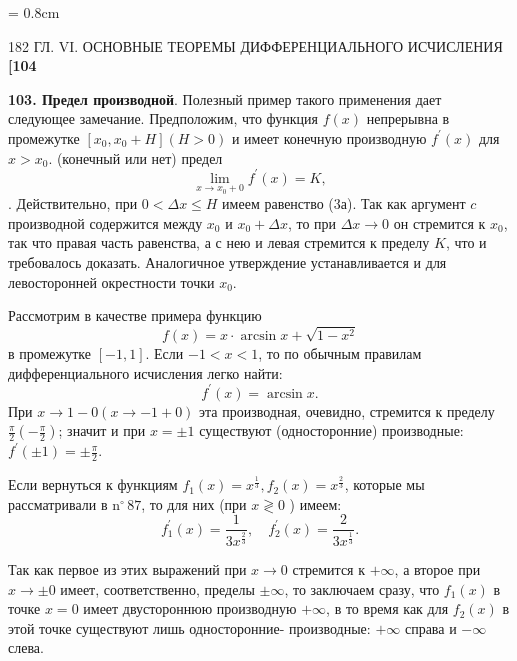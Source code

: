 \documentclass{book}
\begin{document}
\pagestyle{empty}
\parindent = 0.8cm
\fontsize{15.5pt}{14.5pt}\selectfont
{}
\abovedisplayskip=5pt
\belowdisplayskip=5pt
\newenvironment{boldequation}{\renewcommand\theequation{\textbf{\arabic{equation}}}\equation}
{\endequation}

\begin{center} 182
	\hspace{22pt}
	{\normalsize \textsection ГЛ. VI. ОСНОВНЫЕ ТЕОРЕМЫ ДИФФЕРЕНЦИАЛЬНОГО ИСЧИСЛЕНИЯ}
	\hspace{22pt}
	\textbf{[104}\\
\end{center}

\smallskip

\textbf{103. Предел производной}. Полезный пример такого применения дает следующее замечание. Предположим, что функция $f(x)$ непрерывна в промежутке $\left[x_{0}, x_{0}+H\right](H>0)$ и имеет конечную производную $f^{\prime}(x)$ для $x>x_{0}$.  (конечный или нет) предел
$$
	\lim _{x \rightarrow x_{0}+0} f^{\prime}(x)=K,
$$
. Действительно, при $0<\Delta x \leqslant H$ имеем равенство (3а). Так как аргумент $c$ производной содержится между $x_{0}$ и $x_{0}+\Delta x$, то при $\Delta x \rightarrow 0$ он стремится к $x_{0}$, так что правая часть равенства, а с нею и левая стремится к пределу $K$, что и требовалось доказать. Аналогичное утверждение устанавливается и для левосторонней окрестности точки $x_{0}$.

Рассмотрим в качестве примера функцию
$$
	f(x)=x \cdot \arcsin x+\sqrt{1-x^{2}}
$$
в промежутке $[-1,1]$. Если $-1<x<1$, то по обычным правилам дифференциального исчисления легко найти:
$$
	f^{\prime}(x)=\arcsin x.
$$
\noindent При $x \rightarrow 1-0(x \rightarrow-1+0)$ эта производная, очевидно, стремится к пределу $\frac{\pi}{2}\left(-\frac{\pi}{2}\right)$; значит и при $x= \pm 1$ существуют (односторонние) производные: $f^{\prime}( \pm 1)= \pm \frac{\pi}{2}$.

Если вернуться к функциям $f_{1}(x)=x^{\frac{1}{3}}, f_{2}(x)=x^{\frac{2}{3}}$, которые мы рассматривали в $\mathrm{n}^{\circ}\,87$, то для них (при $x \gtrless 0$ ) имеем:
$$
	f_{1}^{\prime}(x)=\frac{1}{3 x^{\frac{2}{3}}}, \quad f_{2}^{\prime}(x)=\frac{2}{3 x^{\frac{1}{3}}} .
$$

\noindent Так как первое из этих выражений при $x \rightarrow 0$ стремится к $+\infty$, а второе при $x \rightarrow \pm 0$ имеет, соответственно, пределы $\pm \infty$, то заключаем сразу, что $f_{1}(x)$ в точке $x=0$ имеет двустороннюю производную $+\infty$, в то время как для $f_{2}(x)$ в этой точке существуют лишь односторонние- производные: $+\infty$ справа и $-\infty$ слева.
\end{document}
